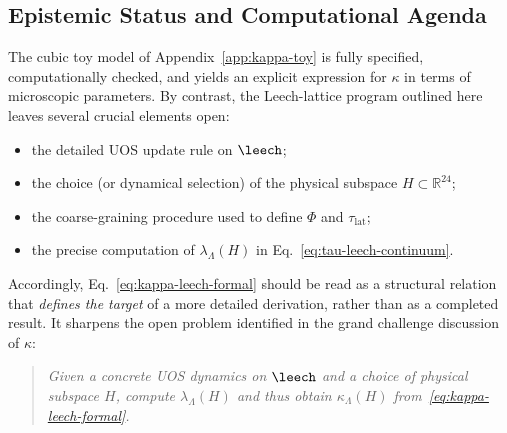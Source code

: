 \subsection{Epistemic Status and Computational Agenda}
\label{subsec:kappa-leech-status}

The cubic toy model of Appendix~\ref{app:kappa-toy} is fully specified,
computationally checked, and yields an explicit expression for $\kappa$ in
terms of microscopic parameters. By contrast, the Leech-lattice program
outlined here leaves several crucial elements open:
\begin{itemize}
  \item the detailed UOS update rule on $\leech$;
  \item the choice (or dynamical selection) of the physical subspace
        $H \subset \mathbb{R}^{24}$;
  \item the coarse-graining procedure used to define $\Phi$ and
        $\tau_{\mathrm{lat}}$;
  \item the precise computation of $\lambda_{\Lambda}(H)$ in
        Eq.~\eqref{eq:tau-leech-continuum}.
\end{itemize}

Accordingly, Eq.~\eqref{eq:kappa-leech-formal} should be read as a structural
relation that \emph{defines the target} of a more detailed derivation, rather
than as a completed result. It sharpens the open problem identified in the
grand challenge discussion of $\kappa$:
\begin{quote}
  \emph{Given a concrete UOS dynamics on $\leech$ and a choice of physical
  subspace $H$, compute $\lambda_{\Lambda}(H)$ and thus obtain
  $\kappa_{\Lambda}(H)$ from~\eqref{eq:kappa-leech-formal}.}
\end{quote}

